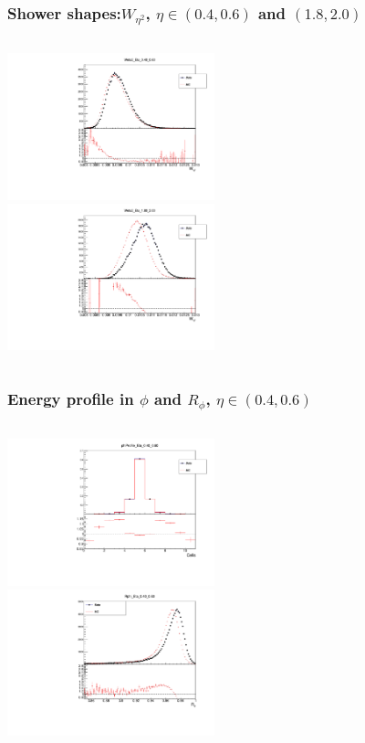 \documentclass{beamer}
\begin{document}
\begin{frame}
\frametitle{Shower shapes:$W_{\eta^2}$, $\eta \in (0.4, 0.6)$ and \textbf{$(1.8, 2.0)$}}

\begin{columns}[t]
\centering
\includegraphics[width=6cm]{weta22_Eta_4_6.pdf}\\
\centering
\includegraphics[width=6cm]{weta22_Eta_18_20.pdf}\\
\end{columns}
\end{frame}
\begin{frame}
\frametitle{Energy profile in $\phi$ and $R_\phi$, $\eta \in (0.4, 0.6)$ }

\begin{columns}[t]
\centering
\includegraphics[width=6cm]{phiProfile2_Eta_4_6.pdf}\\
\centering
\includegraphics[width=6cm]{Rphi2_Eta_4_6.pdf}\\

\end{columns}
\end{frame}
\end{document}
